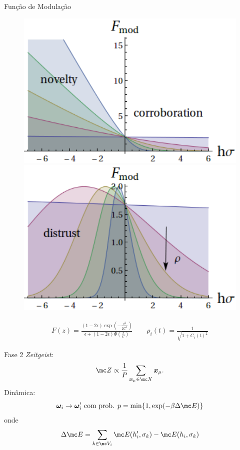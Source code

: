 \documentclass{beamer}
\begin{document}
   \begin{frame}{Função de Modulação}%
       \begin{figure}
           \centering
           \includegraphics[scale=0.4]{Figures/funcmodruido0}
           \quad
           \includegraphics[scale=0.4]{Figures/funcmodruido02}
       \end{figure}

       \begin{align}
           F(z) = \frac{(1 - 2\epsilon)\exp\left(-\frac{z^2}{2C^2}\right)}
           {\epsilon + (1 - 2\epsilon)\Phi\left(\frac{z}{C}\right)}
           \qquad
           \rho_i(t) = \frac{1}{\sqrt{1 + C_i(t)^2}}
       \end{align}
   \end{frame}%

   \begin{frame}{Fase 2}%
    \centering
            \textit{Zeitgeist}:\\
               \[
               \mc Z \propto \frac{1}{P}\sum_{\bm x_\mu \in \mc X}\bm x_\mu.
               \]
            Dinâmica:\\
    \[
        \bm \omega_i \rightarrow \bm \omega_i' \text{ com prob. } 
        p = \min\{1,\exp( -\beta \Delta \mc E)\}
        \]
        onde
        \[
        \Delta \mc E 
        = \sum_{k\in\mc V_i } \mc E(h_i',\sigma_k) - \mc E(h_i,\sigma_k)
\]
   \end{frame}%
\end{document}
